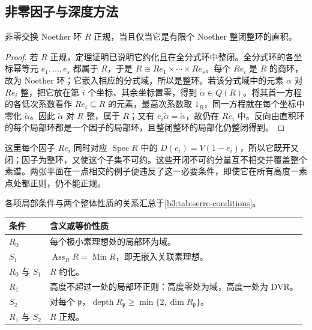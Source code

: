 \subsection{非零因子与深度方法}
\label{b3:subsec:2002:03}

\begin{corollary}\label{b3:cor:normal-product-domains}
	非零交换 Noether 环 \(R\) 正规，当且仅当它是有限个 Noether 整闭整环的直积。
\end{corollary}
\begin{proof}
	若 \(R\) 正规，定理证明已说明它约化且在全分式环中整闭。全分式环的各坐标幂等元 \(e_1,\ldots,e_s\) 都属于 \(R\)，于是 \(R\cong Re_1\times\cdots\times Re_s\)。每个 \(Re_i\) 是 \(R\) 的商环，故为 Noether 环；它嵌入相应的分式域，所以是整环。若该分式域中的元素 \(\alpha\) 对 \(Re_i\) 整，把它放在第 \(i\) 个坐标、其余坐标置零，得到 \(\tilde\alpha\in Q(R)\)。将其首一方程的各低次系数看作 \(Re_i\subseteq R\) 的元素，最高次系数取 \(1_R\)，同一方程就在每个坐标中零化 \(\tilde\alpha\)。因此 \(\tilde\alpha\) 对 \(R\) 整，属于 \(R\)；又有 \(e_i\tilde\alpha=\tilde\alpha\)，故仍在 \(Re_i\) 中。反向由直积环的每个局部环都是一个因子的局部环，且整闭整环的局部化仍整闭得到。
\end{proof}

这里每个因子 \(Re_i\) 同时对应 \(\operatorname{Spec}R\) 中的 \(D(e_i)=V(1-e_i)\)，所以它既开又闭；因子为整环，又使这个子集不可约。这些开闭不可约分量互不相交并覆盖整个素谱。两张平面在一点相交的例子便违反了这一必要条件，即使它在所有高度一素点处都正则，仍不能正规。

\ProseParagraphBreak
各项局部条件与两个整体性质的关系汇总于\cref{b3:tab:serre-conditions}。

\begin{center}
	\begin{minipage}{\textwidth}
		\makeatletter
		\def\@captype{table}
		\makeatother
		\centering
		\caption[Serre 条件与约化性、正规性]{Serre 条件与约化性、正规性。设 \(R\) 为交换 Noether 环；每一行的左右两项等价，\(\mathfrak p\) 均遍历 \(R\) 的素理想。}
		\label{b3:tab:serre-conditions}
		\begin{tabularx}{\textwidth}{@{}>{\raggedright\arraybackslash}p{}>{\raggedright\arraybackslash}X@{}}
			\toprule
			条件 & 含义或等价性质\\
			\midrule
			\(R_0\) & 每个极小素理想处的局部环为域。\\
			\(S_1\) & \(\operatorname{Ass}_R R=\operatorname{Min}R\)，即无嵌入关联素理想。\\
			\(R_0\) 与 \(S_1\) & \(R\) 约化。\\
			\(R_1\) & 高度不超过一处的局部环正则：高度零处为域，高度一处为 DVR。\\
			\(S_2\) & 对每个 \(\mathfrak p\)，\(\operatorname{depth}R_{\mathfrak p}\ge\min\{2,\dim R_{\mathfrak p}\}\)。\\
			\(R_1\) 与 \(S_2\) & \(R\) 正规。\\
			\bottomrule
		\end{tabularx}
	\end{minipage}
\end{center}

